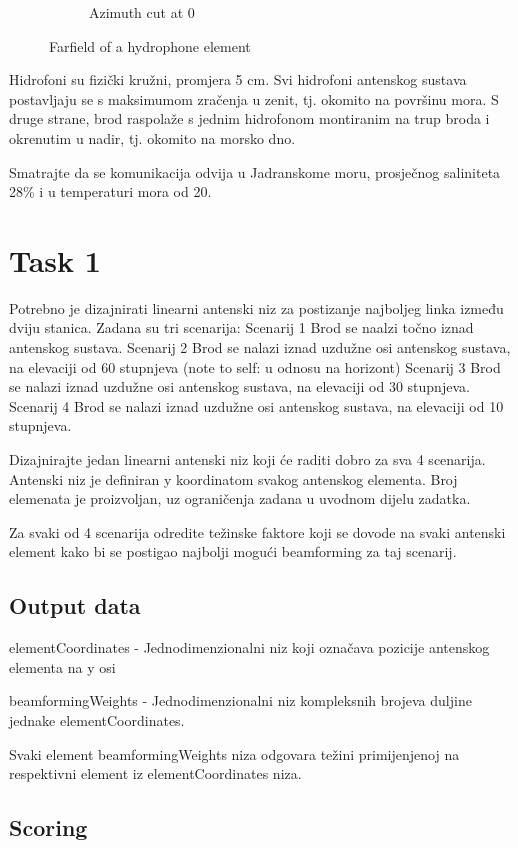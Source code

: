 \begin{figure}[h!]
\begin{subfigure}[b]{0.4\textwidth}
      \caption{Azimuth cut at 0\circ}
   \end{subfigure}
   \caption{Farfield of a hydrophone element}
   \label{fig:hydrophone}
\end{figure}
Hidrofoni su fizički kružni, promjera 5 cm. Svi hidrofoni antenskog sustava postavljaju se s maksimumom zračenja u zenit, tj. okomito na površinu mora. S druge strane, brod raspolaže s jednim hidrofonom montiranim na trup broda i okrenutim u nadir, tj. okomito na morsko dno.

Smatrajte da se komunikacija odvija u Jadranskome moru, prosječnog saliniteta 28\% i u temperaturi mora od 20\circ.


\section*{Task 1}

Potrebno je dizajnirati linearni antenski niz za postizanje najboljeg linka između dviju stanica. Zadana su tri scenarija:
Scenarij 1
Brod se naalzi točno iznad antenskog sustava.
Scenarij 2
Brod se nalazi iznad uzdužne osi antenskog sustava, na elevaciji od 60 stupnjeva (note to self: u odnosu na horizont)
Scenarij 3
Brod se nalazi iznad uzdužne osi antenskog sustava, na elevaciji od 30 stupnjeva.
Scenarij 4
Brod se nalazi iznad uzdužne osi antenskog sustava, na elevaciji od 10 stupnjeva.

Dizajnirajte jedan linearni antenski niz koji će raditi dobro za sva 4 scenarija. Antenski niz je definiran y koordinatom svakog antenskog elementa. Broj elemenata je proizvoljan, uz ograničenja zadana u uvodnom dijelu zadatka.

Za svaki od 4 scenarija odredite težinske faktore koji se dovode na svaki antenski element kako bi se postigao najbolji mogući beamforming za taj scenarij.


\subsection*{Output data}

elementCoordinates - Jednodimenzionalni niz koji označava pozicije antenskog elementa na y osi

beamformingWeights - Jednodimenzionalni niz kompleksnih brojeva duljine jednake elementCoordinates.

Svaki element beamformingWeights niza odgovara težini primijenjenoj na respektivni element iz elementCoordinates niza.


\subsection*{Scoring}

